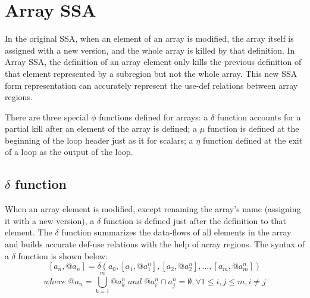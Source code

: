 \documentclass[12pt]{gatech-thesis}
\begin{document}
\newcommand{\Drawgraph}[3]{
	\begin{figure}[H]
	\centering
	\begin{tikzpicture} [auto, >=stealth', scale=.8]

	  \tikzstyle{array}=[rectangle, thick, minimum size=7mm, draw=black!75,font=\sffamily\small]
	  \tikzstyle{scalar}=[circle, thick, minimum size=7mm, draw=black!75,font=\sffamily\small]
	  \tikzstyle{op}=[circle, , draw=black!75, fill=gray!25, minimum size=2mm, font=\sffamily\tiny]
	   \tikzstyle{available}=[blue]
	    \tikzstyle{target}=[red]
	  
 	 \tikzstyle{lbl}=[font=\sffamily\tiny]
  
	 #1
	
	\end{tikzpicture}
	\caption{#2}
	\label{#3}
	\end{figure}
}




\section{Array SSA}

In the original SSA, when an element of an array is modified, the array itself is assigned with a new version, and the whole array is killed by that definition. 
In Array SSA, the definition of an array element only kills the previous definition of that element represented by a subregion but not the whole array. 
This new SSA form representation can accurately represent the use-def relations between array regions. 

There are three special $\phi$ functions defined for arrays: a $\delta$ function accounts for a partial kill after an element of the array is defined; a $\mu$ function is defined at the beginning of the loop header just as it for scalars; a $\eta$ function defined at the exit of a loop as the output of the loop. 



\subsection{$\delta$ function}
 
 When an array element  is modified, except renaming the array's name (assigning it with a new version), a $\delta$ function is defined just after the definition to that element. 
The $\delta$ function summarizes the data-flows of all elements in the array and builds accurate def-use relations with the help of array regions.
 The syntax of a $\delta$ function is shown below:
 $$[a_n, @a_n] = \delta(a_0, [a_1, @a_1^n], [a_2, @a_2^n],  ... , [a_m, @a_m^n] )$$
 $$where \; @a_n=\bigcup_{k=1}^m@a_k^n \; and \; @a_i^n \cap a_j^n = \emptyset, \forall 1\le i,j \le m, i \ne j$$
\end{document}
